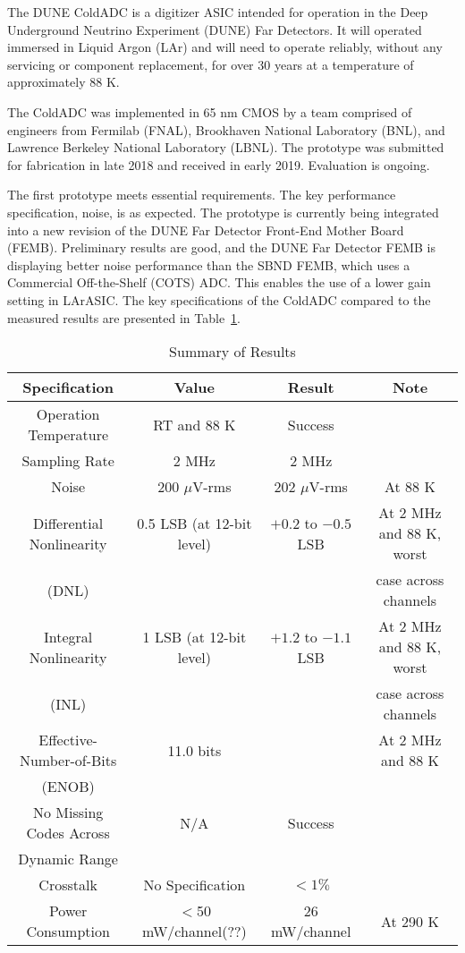 \label{sec:1}

The DUNE ColdADC is a digitizer ASIC intended for operation in the Deep Underground Neutrino Experiment (DUNE) Far Detectors. It will operated immersed in Liquid Argon (LAr) and will need to operate reliably, without any servicing or component replacement, for over 30 years at a temperature of approximately 88 K. 

The ColdADC was implemented in 65 nm CMOS by a team comprised of engineers from Fermilab (FNAL), Brookhaven National Laboratory (BNL), and Lawrence Berkeley National Laboratory (LBNL). The prototype was submitted for fabrication in late 2018 and received in early 2019. Evaluation is ongoing. 

The first prototype meets essential requirements. The key performance specification, noise, is as expected. The prototype is currently being integrated into a new revision of the DUNE Far Detector Front-End Mother Board (FEMB). Preliminary results are good, and the DUNE Far Detector FEMB is displaying better noise performance than the SBND FEMB, which uses a Commercial Off-the-Shelf (COTS) ADC. This enables the use of a lower gain setting in LArASIC. The key specifications of the ColdADC compared to the measured results are presented in Table~\ref{tab:coldadc_specs}.
\begin{table}[h]
\centering
\begin{tabular}{|c|c|c|c|}
\hline
\textbf{ Specification } & \textbf{Value} & \textbf{Result} & \textbf{Note}  \\ \hline \hline
Operation Temperature &  RT and 88 K & Success & \\ \hline
Sampling Rate & 2 MHz & 2 MHz & \\ \hline
Noise & 200 $\mu$V-rms & 202 $\mu$V-rms & At 88 K \\ \hline
Differential Nonlinearity & 0.5 LSB (at 12-bit level) & $+0.2$ to $-0.5$ LSB & At 2 MHz and 88 K, worst \\
(DNL) & & & case across channels \\ \hline
Integral Nonlinearity & 1 LSB (at 12-bit level) & $+1.2$ to $-1.1$ LSB & At 2 MHz and 88 K, worst \\
(INL) & & & case across channels \\ \hline
Effective-Number-of-Bits & 11.0 bits & & At 2 MHz and 88 K \\ 
(ENOB) & & & \\ \hline
No Missing Codes Across & N/A & Success & \\ 
Dynamic Range & & & \\ \hline
Crosstalk  & No Specification & $<1\%$ & \\ \hline
Power Consumption & $<$50 mW/channel(??) & 26 mW/channel & At 290 K \\ \hline
\end{tabular}
\caption{Summary of Results}
\label{tab:coldadc_specs}
\end{table}

